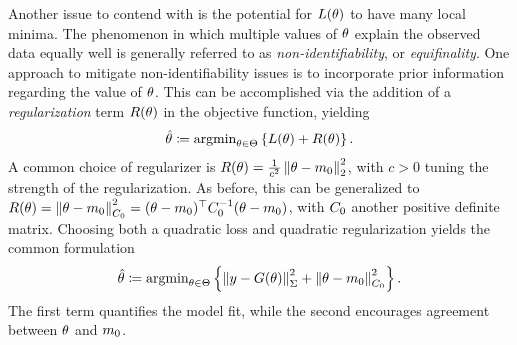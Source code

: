 \documentclass[12pt]{article}
\begin{document}
Another issue to contend with is the potential for $L(\theta)$ to have many local minima. The phenomenon in which 
multiple values of $\theta$ explain the observed data equally well is generally referred to as \textit{non-identifiability}, 
or \textit{equifinality}. One approach to mitigate non-identifiability issues is to incorporate prior information regarding 
the value of $\theta$. This can be accomplished via the addition of a \textit{regularization} term $R(\theta)$ in 
the objective function, yielding 
\begin{align}
\hat{\theta} \coloneqq \text{argmin}_{\theta \in \Theta} \left\{L(\theta) + R(\theta) \right\}. \label{opt_reg}
\end{align}
A common choice of regularizer is $R(\theta) = \frac{1}{c^2} \left\lVert\theta - m_0\right\rVert_2^2$, with $c > 0$ tuning 
the strength of the regularization. As before, this can be generalized to 
$R(\theta) = \left\lVert\theta - m_0\right\rVert_{C_0}^2 = (\theta - m_0)^\top C_0^{-1} (\theta - m_0)$, 
with $C_0$ another positive definite matrix. 
Choosing both a quadratic loss and quadratic regularization yields the common formulation
\begin{align}
\hat{\theta} \coloneqq \text{argmin}_{\theta \in \Theta} \left\{\left\lVert y - G(\theta)\right\rVert^2_{\Sigma} + \left\lVert\theta - m_0\right\rVert_{C_0}^2\right\}. \label{quadratic_opt}
\end{align}
The first term quantifies the model fit, while the second encourages agreement between $\theta$ and $m_0$.
\end{document}
